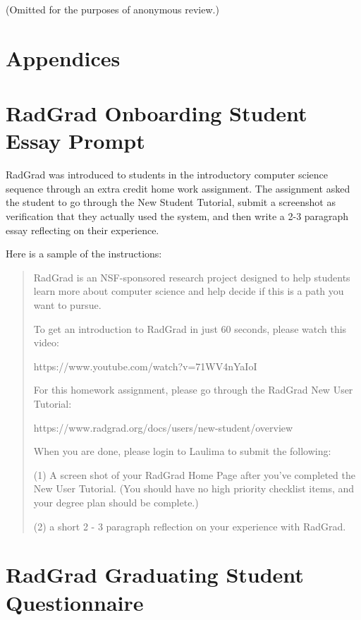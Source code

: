 \documentclass[acmsmall]{acmart}
\begin{document}
(Omitted for the purposes of anonymous review.)

\section{Appendices}

\appendix

\section{RadGrad Onboarding Student Essay Prompt}
\label{sec:onboarding-student-essay-prompt}

RadGrad was introduced to students in the introductory computer science sequence through an extra credit home work assignment. The assignment asked the student to go through the New Student Tutorial, submit a screenshot as verification that they actually used the system, and then write a 2-3 paragraph essay reflecting on their experience.

Here is a sample of the instructions:

\begin{quotation}
RadGrad is an NSF-sponsored research project designed to help students learn more about computer science and help decide if this is a path you want to pursue.

\medskip

\noindent To get an introduction to RadGrad in just 60 seconds, please watch this video:

https://www.youtube.com/watch?v=71WV4nYaIoI

\medskip

\noindent For this homework assignment, please go through the RadGrad New User Tutorial:

https://www.radgrad.org/docs/users/new-student/overview

\medskip

\noindent When you are done, please login to Laulima to submit the following:

(1) A screen shot of your RadGrad Home Page after you’ve completed the New User Tutorial. (You should have no high priority checklist items, and your degree plan should be complete.)

(2) a short 2 - 3 paragraph reflection on your experience with RadGrad.
\end{quotation}


\section{RadGrad Graduating Student Questionnaire}
\label{sec:graduating-student-questionnaire}
\end{document}
